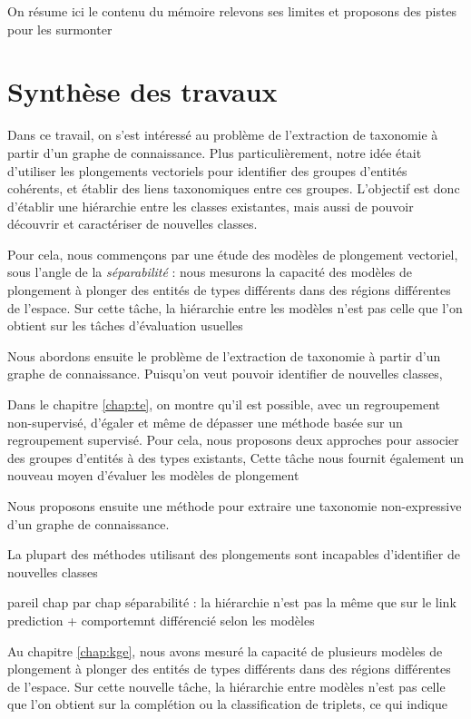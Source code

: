 \label{sec:Conclusion}


On résume ici le contenu du mémoire
relevons ses limites et proposons des pistes pour les surmonter


\section{Synthèse des travaux}


Dans ce travail, on s'est intéressé au problème de l'extraction de taxonomie à partir d'un graphe de connaissance. Plus particulièrement, notre idée était d'utiliser les plongements vectoriels pour identifier des groupes d'entités cohérents, et établir des liens taxonomiques entre ces groupes. L'objectif est donc d'établir une hiérarchie entre les classes existantes, mais aussi de pouvoir découvrir et caractériser de nouvelles classes. 

Pour cela, nous commençons par une étude des modèles de plongement vectoriel, sous l'angle de la \textit{séparabilité} : nous mesurons la capacité des modèles de plongement à plonger des entités de types différents dans des régions différentes de l'espace. Sur cette tâche, la hiérarchie entre les modèles n'est pas celle que l'on obtient sur les tâches d'évaluation usuelles

Nous abordons ensuite le problème de l'extraction de taxonomie à partir d'un graphe de connaissance. Puisqu'on veut pouvoir identifier de nouvelles classes, 

Dans le chapitre \ref{chap:te}, on montre qu'il est possible, avec un regroupement non-supervisé, d'égaler et même de dépasser une méthode basée sur un regroupement supervisé. Pour cela, nous proposons deux approches pour associer des groupes d'entités à des types existants, 
Cette tâche nous fournit également un nouveau moyen d'évaluer les modèles de plongement




Nous proposons ensuite une méthode pour extraire une taxonomie non-expressive d'un graphe de connaissance. 


La plupart des méthodes utilisant des plongements sont incapables d'identifier de nouvelles classes


pareil chap par chap 
séparabilité : la hiérarchie n'est pas la même que sur le link prediction + comportemnt différencié selon les modèles

Au chapitre \ref{chap:kge}, nous avons mesuré la capacité de plusieurs modèles de plongement à plonger des entités de types différents dans des régions différentes de l'espace. Sur cette nouvelle tâche, la hiérarchie entre modèles n'est pas celle que l'on obtient sur la complétion ou la classification de triplets, ce qui indique 



